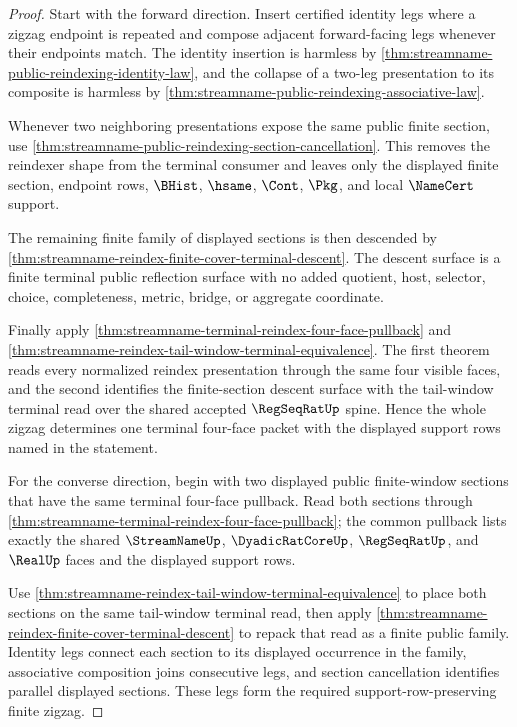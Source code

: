 \begin{proof}
Start with the forward direction. Insert certified identity legs where a
zigzag endpoint is repeated and compose adjacent forward-facing legs whenever
their endpoints match. The identity insertion is harmless by
\autoref{thm:streamname-public-reindexing-identity-law}, and the collapse of a
two-leg presentation to its composite is harmless by
\autoref{thm:streamname-public-reindexing-associative-law}.

Whenever two neighboring presentations expose the same public finite section,
use \autoref{thm:streamname-public-reindexing-section-cancellation}. This
removes the reindexer shape from the terminal consumer and leaves only the
displayed finite section, endpoint rows, $\BHist$, $\hsame$, $\Cont$, $\Pkg$,
and local $\NameCert$ support.

The remaining finite family of displayed sections is then descended by
\autoref{thm:streamname-reindex-finite-cover-terminal-descent}. The descent
surface is a finite terminal public reflection surface with no added quotient,
host, selector, choice, completeness, metric, bridge, or aggregate coordinate.

Finally apply
\autoref{thm:streamname-terminal-reindex-four-face-pullback} and
\autoref{thm:streamname-reindex-tail-window-terminal-equivalence}. The first
theorem reads every normalized reindex presentation through the same four
visible faces, and the second identifies the finite-section descent surface
with the tail-window terminal read over the shared accepted $\RegSeqRatUp$
spine. Hence the whole zigzag determines one terminal four-face packet with
the displayed support rows named in the statement.

For the converse direction, begin with two displayed public finite-window
sections that have the same terminal four-face pullback. Read both sections
through \autoref{thm:streamname-terminal-reindex-four-face-pullback}; the
common pullback lists exactly the shared $\StreamNameUp$, $\DyadicRatCoreUp$,
$\RegSeqRatUp$, and $\RealUp$ faces and the displayed support rows.

Use \autoref{thm:streamname-reindex-tail-window-terminal-equivalence} to place
both sections on the same tail-window terminal read, then apply
\autoref{thm:streamname-reindex-finite-cover-terminal-descent} to repack that
read as a finite public family. Identity legs connect each section to its
displayed occurrence in the family, associative composition joins consecutive
legs, and section cancellation identifies parallel displayed sections. These
legs form the required support-row-preserving finite zigzag.
\end{proof}

